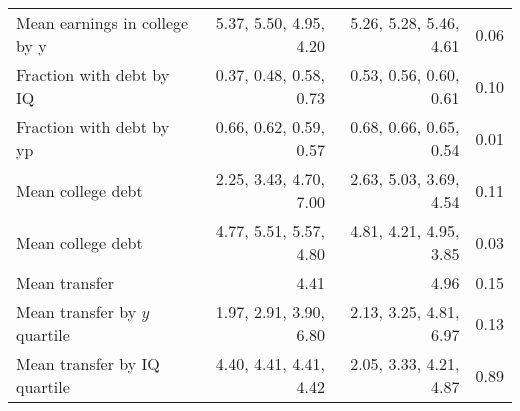 \begin{tabular}{lrrr}
Mean earnings in college by y & 5.37, 5.50, 4.95, 4.20  & 5.26, 5.28, 5.46, 4.61  & 0.06  \\ 
Fraction with debt by IQ & 0.37, 0.48, 0.58, 0.73  & 0.53, 0.56, 0.60, 0.61  & 0.10  \\ 
Fraction with debt by yp & 0.66, 0.62, 0.59, 0.57  & 0.68, 0.66, 0.65, 0.54  & 0.01  \\ 
Mean college debt & 2.25, 3.43, 4.70, 7.00  & 2.63, 5.03, 3.69, 4.54  & 0.11  \\ 
Mean college debt & 4.77, 5.51, 5.57, 4.80  & 4.81, 4.21, 4.95, 3.85  & 0.03  \\ 
Mean transfer & 4.41  & 4.96  & 0.15  \\ 
Mean transfer by $y$ quartile & 1.97, 2.91, 3.90, 6.80  & 2.13, 3.25, 4.81, 6.97  & 0.13  \\ 
Mean transfer by IQ quartile & 4.40, 4.41, 4.41, 4.42  & 2.05, 3.33, 4.21, 4.87  & 0.89  \\ 
\hline
\end{tabular}%
